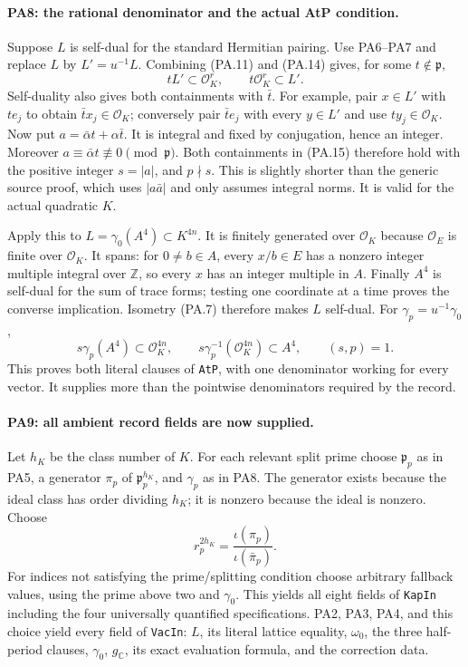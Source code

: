 \paragraph{PA8: the rational denominator and the actual AtP condition.}
Suppose $L$ is self-dual for the standard Hermitian pairing.
Use PA6--PA7 and replace $L$ by $L'=u^{-1}L$. Combining
(PA.11) and (PA.14) gives, for some $t\notin\mathfrak p$,
\[
                   tL'\subset\mathcal O_K^r,
                 \qquad t\mathcal O_K^r\subset L'.            \tag{PA.15}
\]
Self-duality also gives both containments with $\bar t$.
For example, pair $x\in L'$ with $te_j$ to obtain
$\bar t x_j\in\mathcal O_K$; conversely pair $\bar t e_j$
with every $y\in L'$ and use $ty_j\in\mathcal O_K$.
Now put $a=\bar\alpha t+\alpha\bar t$. It is integral and
fixed by conjugation, hence an integer. Moreover
$a\equiv\bar\alpha t\not\equiv0\pmod{\mathfrak p}$.
Both containments in (PA.15) therefore hold with the positive
integer $s=|a|$, and $p\nmid s$. This is slightly shorter than
the generic source proof, which uses $|a\bar a|$ and only
assumes integral norms. It is valid for the actual quadratic $K$.

Apply this to
$L=\gamma_0(A^4)\subset K^{4n}$. It is finitely generated over
$\mathcal O_K$ because $\mathcal O_E$ is finite over
$\mathcal O_K$. It spans: for $0\ne b\in A$, every $x/b\in E$
has a nonzero integer multiple integral over $\mathbb Z$, so
every $x$ has an integer multiple in $A$. Finally $A^4$ is
self-dual for the sum of trace forms; testing one coordinate
at a time proves the converse implication. Isometry (PA.7)
therefore makes $L$ self-dual. For $\gamma_p=u^{-1}\gamma_0$,
\[
 s\gamma_p(A^4)\subset\mathcal O_K^{4n},\qquad
 s\gamma_p^{-1}(\mathcal O_K^{4n})\subset A^4,
 \qquad (s,p)=1.                                               \tag{PA.16}
\]
This proves both literal clauses of \texttt{AtP}, with one
denominator working for every vector. It supplies more than the
pointwise denominators required by the record.

\paragraph{PA9: all ambient record fields are now supplied.}
Let $h_K$ be the class number of $K$. For each relevant split prime
choose $\mathfrak p_p$ as in PA5, a generator $\pi_p$ of
$\mathfrak p_p^{h_K}$, and $\gamma_p$ as in PA8. The generator
exists because the ideal class has order dividing $h_K$; it is
nonzero because the ideal is nonzero. Choose
\[
 r_p^{2h_K}=\frac{\iota(\pi_p)}{\iota(\bar\pi_p)}.
                                                               \tag{PA.17}
\]
For indices not satisfying the prime/splitting condition choose
arbitrary fallback values, using the prime above two and
$\gamma_0$. This yields all eight fields of \texttt{KapIn}
including the four universally quantified specifications.
PA2, PA3, PA4, and this choice yield every field of
\texttt{VacIn}: $L$, its literal lattice equality, $\omega_0$,
the three half-period clauses, $\gamma_0$, $g_{\mathbb C}$, its
exact evaluation formula, and the correction data.

